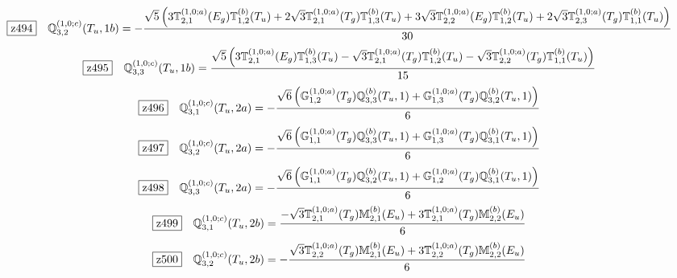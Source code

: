 \documentclass[fleqn,10pt,landscape]{jsarticle}
\begin{document}
\begin{dmath*}
\hspace*{3mm}\fbox{z494}\quad \mathbb{Q}_{3,2}^{(1,0;c)}(T_{u},1b)=- \frac{\sqrt{5} \left(3 \mathbb{T}_{2,1}^{(1,0;a)}(E_{g}) \mathbb{T}_{1,2}^{(b)}(T_{u}) + 2 \sqrt{3} \mathbb{T}_{2,1}^{(1,0;a)}(T_{g}) \mathbb{T}_{1,3}^{(b)}(T_{u}) + 3 \sqrt{3} \mathbb{T}_{2,2}^{(1,0;a)}(E_{g}) \mathbb{T}_{1,2}^{(b)}(T_{u}) + 2 \sqrt{3} \mathbb{T}_{2,3}^{(1,0;a)}(T_{g}) \mathbb{T}_{1,1}^{(b)}(T_{u})\right)}{30}
\end{dmath*}
\begin{dmath*}
\hspace*{3mm}\fbox{z495}\quad \mathbb{Q}_{3,3}^{(1,0;c)}(T_{u},1b)=\frac{\sqrt{5} \left(3 \mathbb{T}_{2,1}^{(1,0;a)}(E_{g}) \mathbb{T}_{1,3}^{(b)}(T_{u}) - \sqrt{3} \mathbb{T}_{2,1}^{(1,0;a)}(T_{g}) \mathbb{T}_{1,2}^{(b)}(T_{u}) - \sqrt{3} \mathbb{T}_{2,2}^{(1,0;a)}(T_{g}) \mathbb{T}_{1,1}^{(b)}(T_{u})\right)}{15}
\end{dmath*}
\begin{dmath*}
\hspace*{3mm}\fbox{z496}\quad \mathbb{Q}_{3,1}^{(1,0;c)}(T_{u},2a)=- \frac{\sqrt{6} \left(\mathbb{G}_{1,2}^{(1,0;a)}(T_{g}) \mathbb{Q}_{3,3}^{(b)}(T_{u},1) + \mathbb{G}_{1,3}^{(1,0;a)}(T_{g}) \mathbb{Q}_{3,2}^{(b)}(T_{u},1)\right)}{6}
\end{dmath*}
\begin{dmath*}
\hspace*{3mm}\fbox{z497}\quad \mathbb{Q}_{3,2}^{(1,0;c)}(T_{u},2a)=- \frac{\sqrt{6} \left(\mathbb{G}_{1,1}^{(1,0;a)}(T_{g}) \mathbb{Q}_{3,3}^{(b)}(T_{u},1) + \mathbb{G}_{1,3}^{(1,0;a)}(T_{g}) \mathbb{Q}_{3,1}^{(b)}(T_{u},1)\right)}{6}
\end{dmath*}
\begin{dmath*}
\hspace*{3mm}\fbox{z498}\quad \mathbb{Q}_{3,3}^{(1,0;c)}(T_{u},2a)=- \frac{\sqrt{6} \left(\mathbb{G}_{1,1}^{(1,0;a)}(T_{g}) \mathbb{Q}_{3,2}^{(b)}(T_{u},1) + \mathbb{G}_{1,2}^{(1,0;a)}(T_{g}) \mathbb{Q}_{3,1}^{(b)}(T_{u},1)\right)}{6}
\end{dmath*}
\begin{dmath*}
\hspace*{3mm}\fbox{z499}\quad \mathbb{Q}_{3,1}^{(1,0;c)}(T_{u},2b)=\frac{- \sqrt{3} \mathbb{T}_{2,1}^{(1,0;a)}(T_{g}) \mathbb{M}_{2,1}^{(b)}(E_{u}) + 3 \mathbb{T}_{2,1}^{(1,0;a)}(T_{g}) \mathbb{M}_{2,2}^{(b)}(E_{u})}{6}
\end{dmath*}
\begin{dmath*}
\hspace*{3mm}\fbox{z500}\quad \mathbb{Q}_{3,2}^{(1,0;c)}(T_{u},2b)=- \frac{\sqrt{3} \mathbb{T}_{2,2}^{(1,0;a)}(T_{g}) \mathbb{M}_{2,1}^{(b)}(E_{u}) + 3 \mathbb{T}_{2,2}^{(1,0;a)}(T_{g}) \mathbb{M}_{2,2}^{(b)}(E_{u})}{6}
\end{dmath*}
\end{document}
